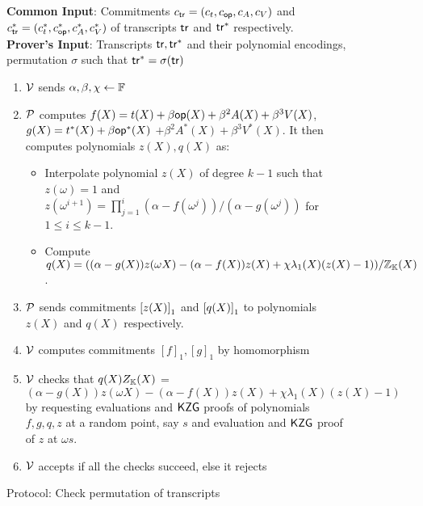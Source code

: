 \begin{figure}[htbp]

    \begin{mdframed}
    {
            {\bf Common Input}: Commitments $c_{\mathsf{tr}}=(c_t,c_{\mathsf{op}},c_A, c_V)$ and $c_{\mathsf{tr}}^\ast=(c_t^\ast,c_{\mathsf{op}}^\ast, c_A^\ast, c_V^\ast)$
        of transcripts $\mathsf{tr}$ and $\mathsf{tr}^\ast$ respectively.\\
    {\bf Prover's Input}: Transcripts $\mathsf{tr}, \mathsf{tr}^{*}$ and their polynomial encodings, permutation $\sigma$ such that $\mathsf{tr}^{*}=\sigma(\mathsf{tr})$
        \begin{enumerate}[leftmargin=1em, label=\arabic*]
            \item $\mathcal{V}$ sends $\alpha,\beta, \chi\gets \mathbb{F}$
            \item $\mathcal{P}$ computes $f(X)=t(X) + \beta \mathsf{op}(X) + \beta^2 A(X) + \beta^3 V(X)$, $g(X) = t^\ast(X) + \beta \mathsf{op}^\ast(X)$
            $+ \beta^2 A^\ast(X) + \beta^3 V^\ast(X)$. It then computes polynomials $z(X),q(X)$ as:
            \begin{itemize}[leftmargin=1em]
                \item Interpolate polynomial $z(X)$ of degree $k-1$ such that $z(\omega)=1$ and
                $z(\omega^{i+1})=\prod_{j=1}^i (\alpha - f(\omega^j))/(\alpha - g(\omega^j))$ for $1\leq i\leq k-1$.
                \item Compute $q(X) = ((\alpha - g(X))z(\omega X) - (\alpha - f(X))z(X) + \chi\lambda_1(X)(z(X) - 1))/\mathbb{Z}_{\mathbb{K}}(X)$.
            \end{itemize}
            \item $\mathcal{P}$ sends commitments $\left[{z(X)}\right]_1$ and $\left[{q(X)}\right]_1$ to polynomials $z(X)$ and $q(X)$ respectively.
            \item $\mathcal{V}$ computes commitments $[f]_1, [g]_1$ by homomorphism
            \item $\mathcal{V}$ checks that $q(X)Z_{\mathbb{K}}(X)$ = $(\alpha - g(X))z(\omega X)-(\alpha - f(X))z(X) + \chi\lambda_1(X)(z(X) - 1)$
            by requesting evaluations and $\mathsf{KZG}$ proofs of polynomials $f,g, q, z$ at a random point, say $s$ and evaluation and $\mathsf{KZG}$ proof of $z$ at $\omega s$.
            \item $\mathcal{V}$ accepts if all the checks succeed, else it rejects
        \end{enumerate}
    }
    \end{mdframed}
    \vspace*{-5mm}
    \caption{Protocol: Check permutation of transcripts}
    \label{fig:permutated-transcripts}
\end{figure}


